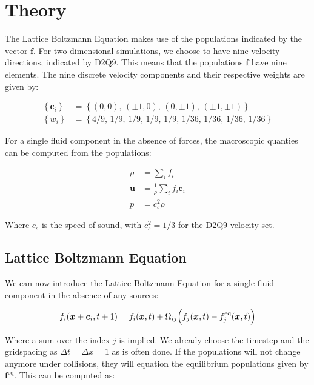 \clearpage
\section{Theory}\label{sec:Theory}
The Lattice Boltzmann Equation makes use of the populations indicated by the vector $\bm{f}$. For two-dimensional simulations, we choose to have nine velocity directions, indicated by D2Q9. This means that the populations $\bm{f}$ have nine elements. The nine discrete velocity components and their respective weights are given by:

\begin{equation}\label{eq:Discrete velocity components and weights}
\begin{split}
    \left\{\bm{c}_i\right\} &= \left\{(0,0),\, (\pm 1, 0),\, (0, \pm 1),\, (\pm 1, \pm 1)\right\}\\
    \left\{w_i\right\} &= \left\{4/9,\, 1/9,\, 1/9,\, 1/9,\, 1/9,\, 1/36,\, 1/36,\, 1/36,\, 1/36\right\}
\end{split}
\end{equation}

For a single fluid component in the absence of forces, the macroscopic quanties can be computed from the populations:

\begin{equation}\label{eq:Macroscopic quantities}
\begin{split}
    \rho &= \sum_{i} f_i\\
    \bm{u} &= \frac{1}{\rho} \sum_i f_i \bm{c}_i\\
    p &= c_s^2 \rho
\end{split}
\end{equation}

Where $c_s$ is the speed of sound, with $c_s^2 = 1/3$ for the D2Q9 velocity set. 

\subsection{Lattice Boltzmann Equation}\label{subsec:Lattice Boltzmann Equation}
We can now introduce the Lattice Boltzmann Equation for a single fluid component in the absence of any sources:

\begin{equation}\label{eq:Lattice boltzmann equation}
    f_i(\bm{x} + \bm{c}_i, t+1) = f_i(\bm{x}, t) + \Omega_{i j} \Bigl(f_j(\bm{x}, t) - f_j^{\text{eq}}(\bm{x}, t)\Bigr)
\end{equation}

Where a sum over the index $j$ is implied. We already choose the timestep and the gridspacing as $\Delta t = \Delta x = 1$ as is often done. If the populations will not change anymore under collisions, they will equation the equilibrium populations given by $\bm{f}^{\text{eq}}$. This can be computed as:

